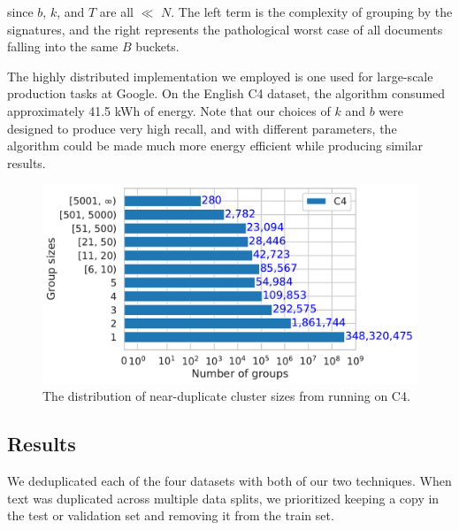 \noindent since $b$, $k$, and $T$ are all $\ll$ $N$. The left term is the complexity of grouping by the signatures, and the right represents the pathological worst case of all documents falling into the same $B$ buckets.

The highly distributed \Approx{} implementation we employed is one used for large-scale production tasks at Google.
On the English C4 dataset, the algorithm consumed approximately 41.5 kWh of energy.
Note that our choices of $k$ and $b$ were designed to produce very high recall, and with different parameters, the algorithm could be made much more energy efficient while producing similar results.


\begin{figure}[t]
    \centering
    \includegraphics[width=0.6\linewidth]{figures/nd3/nd3-cluster-hist-c4.pdf}
    \caption{The distribution of near-duplicate cluster sizes from running \Approx{} on C4.}
    \label{fig:nd3-cluster-hist-c4}
\end{figure}

\subsection{Results}\label{sec:deduplication-results}
We deduplicated each of the four datasets with both of our two techniques.
When text was duplicated across multiple data splits, we prioritized keeping a copy in the test or validation set and removing it from the train set.
%





